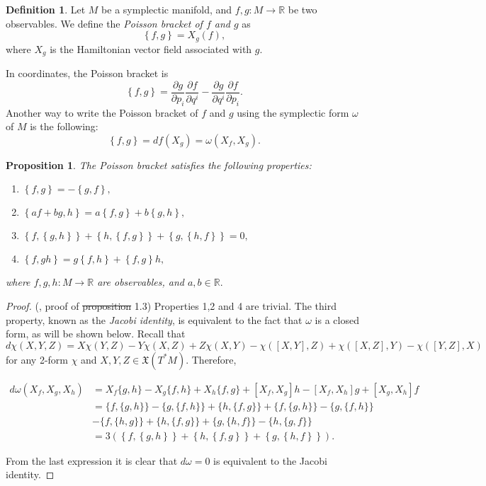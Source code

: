 \documentclass[12pt, letterpaper, reqno]{amsart}
\theoremstyle{definition}
\newtheorem{df}{Definition}
\theoremstyle{plain}
\newtheorem{prop}{Proposition}
\theoremstyle{remark}
\providecommand{\DIFadd}[1]{{\protect\color{blue}\uwave{#1}}} %
\providecommand{\DIFdel}[1]{{\protect\color{red}\sout{#1}}}                      %
\providecommand{\DIFaddbegin}{} %
\providecommand{\DIFaddend}{} %
\providecommand{\DIFdelbegin}{} %
\providecommand{\DIFdelend}{} %
\newcommand{\DIFscaledelfig}{0.5}
\newlength{\DIFdelgraphicswidth} %
\newlength{\DIFdelgraphicsheight} %
\newcommand{\DIFaddincludegraphics}[2][]{{\color{blue}\fbox{\DIFOincludegraphics[#1]{#2}}}} %
\newcommand{\DIFdelincludegraphics}[2][]{%
\sbox{\DIFdelgraphicsbox}{\DIFOincludegraphics[#1]{#2}}%
\settoboxwidth{\DIFdelgraphicswidth}{\DIFdelgraphicsbox} %
\settoboxtotalheight{\DIFdelgraphicsheight}{\DIFdelgraphicsbox} %
\scalebox{\DIFscaledelfig}{%
\parbox[b]{\DIFdelgraphicswidth}{\usebox{\DIFdelgraphicsbox}\\[-\baselineskip] \rule{\DIFdelgraphicswidth}{0em}}\llap{\resizebox{\DIFdelgraphicswidth}{\DIFdelgraphicsheight}{%
\setlength{\unitlength}{\DIFdelgraphicswidth}%
\begin{picture}(1,1)%
\thicklines\linethickness{2pt} %
{\color[rgb]{1,0,0}\put(0,0){\framebox(1,1){}}}%
{\color[rgb]{1,0,0}\put(0,0){\line( 1,1){1}}}%
{\color[rgb]{1,0,0}\put(0,1){\line(1,-1){1}}}%
\end{picture}%
}\hspace*{3pt}}} %
} %
\DeclareRobustCommand{\DIFaddbegin}{\DIFOaddbegin \let\includegraphics\DIFaddincludegraphics} %
\DeclareRobustCommand{\DIFaddend}{\DIFOaddend \let\includegraphics\DIFOincludegraphics} %
\DeclareRobustCommand{\DIFdelbegin}{\DIFOdelbegin \let\includegraphics\DIFdelincludegraphics} %
\DeclareRobustCommand{\DIFdelend}{\DIFOaddend \let\includegraphics\DIFOincludegraphics} %
\begin{document}
\begin{df}
	Let $ M $ be a symplectic manifold, and $ f,g: M \rightarrow \mathbb{R} $ be two observables. We define the \textit{Poisson bracket of $ f $ and $ g $ } as 
	$$ \left\{ f,g \right\}= X_g(f),$$ 
	where $ X_g  $ is the Hamiltonian vector field associated with $ g. $ 
\end{df}
In coordinates, the Poisson bracket is 
$$ \left\{ f,g \right\} = \frac{\partial g}{\partial p_i}\frac{\partial f}{\partial q^i} - \frac{\partial g}{\partial q^i} \frac{\partial f}{\partial p_i}.   $$ 
Another way to write the Poisson bracket of $ f $ and $ g $ using the symplectic form $ \omega $ of $M$ is the following:
$$ \left\{ f,g \right\} = df(X_g)=\omega (X_f,X_g). $$ 
\begin{prop}\DIFaddbegin \label{prop:Poisson_bracket_properties}
	\DIFaddend The Poisson bracket satisfies the following properties:
	\begin{enumerate}
		\item $ \left\{ f,g \right\} = -\left\{ g,f \right\},$ 
		\item $ \left\{ af+bg,h \right\} = a\left\{ f,g \right\}+ b \left\{ g,h \right\} ,   $ 
		\item $ \left\{ f, \left\{ g,h \right\}  \right\} +\left\{ h, \left\{ f,g \right\}  \right\} + \left\{ g, \left\{ h,f \right\}  \right\} =0, $  
		\item $ \left\{ f,gh \right\} =g \left\{ f,h \right\} + \left\{ f,g \right\} h,$ 
	\end{enumerate}
	where $ f,g,h: M \rightarrow \mathbb{R} $ are observables, and $ a,b\in \mathbb{R}. $ 
\end{prop}
\begin{proof}
	(\cite{poisson}, proof of \DIFdelbegin \DIFdel{proposition }\DIFdelend \DIFaddbegin \DIFadd{Proposition }\DIFaddend 1.3) Properties 1,2 and 4 are trivial. The third property, known as the \textit{Jacobi identity},  is equivalent to the fact that $ \omega $ is a closed form, as will be shown below. Recall that $$ d\chi(X,Y,Z)=X\chi(Y,Z)-Y\chi(X,Z)+Z\chi(X,Y)-\chi([X,Y],Z)+\chi([X,Z],Y)-\chi([Y,Z],X) $$ 
	for any 2-form $ \chi $ and $ X,Y,Z\in \mathfrak{X}(T^*M). $ Therefore, 


$\begin{aligned}
	d \omega\left(X_{f}, X_{g}, X_{h}\right) &=X_{f}\{g, h\}-X_{g}\{f, h\}+X_{h}\{f, g\}+\left[X_{f}, X_{g}\right] h-\left[X_{f}, X_{h}\right] g+\left[X_{g}, X_{h}\right] f \\
&=\{f,\{g, h\}\}-\{g,\{f, h\}\}+\{h,\{f, g\}\}+\{f,\{g, h\}\}-\{g,\{f, h\}\} \\
&-\{f,\{h, g\}\}+\{h,\{f, g\}\}+\{g,\{h, f\}\}-\{h,\{g, f\}\} \\
&=3 \left( \left\{ f, \left\{ g,h \right\}  \right\} +\left\{ h, \left\{ f,g \right\}  \right\} + \left\{ g, \left\{ h,f \right\}  \right\}\right).  
\end{aligned}$

From the last expression it is clear that $ d\omega=0 $ is equivalent to the Jacobi identity.
\end{proof}
\end{document}
